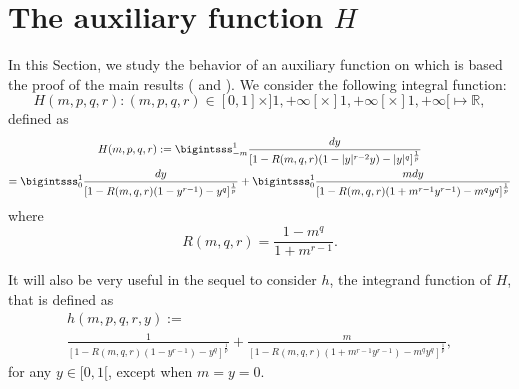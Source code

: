 \documentclass{amsart}
\theoremstyle{definition}
\theoremstyle{remark}
\newcommand{\R}{\mathbb{R}}
\begin{document}
\section{The auxiliary function $H$}
\label{sec_H}
In this Section, we study the behavior of an auxiliary function on which is based the proof of the main results ( and ). We consider the following integral function:
\[ H(m,p,q,r):(m,p,q,r)\in[0,1]\times]1,+\infty[\times]1,+\infty[\times]1,+\infty[\mapsto\R,\]
defined as 
\begin{multline}
\label{Hdef}
H(m,p,q,r):= \bigintsss_{-m}^1\frac{dy}{ [1- R(m,q,r)(1- |y|^{r-2}y) - |y|^q]^\frac1p}\\
=\bigintsss_{0}^1  \frac{dy}{ [1-R(m,q,r)(1-y^{r-1}) - y^q]^\frac1p}  +\bigintsss_{0}^1\frac{mdy}{ [1-R(m,q,r)(1+m^{r-1} y^{r-1}) -m^q y^q]^\frac1p}
\end{multline}
where 
\begin{equation}\label{Rdef}
R(m,q,r)=\frac{1-m^q}{1+m^{r-1}}.
\end{equation}

It will also be very useful in the sequel to consider $h$, the integrand function of $H$, that is defined as
\begin{multline*}
h(m,p,q,r,y):=\\ \frac{1}{ [1-R(m,q,r)(1-y^{r-1}) - y^q ]^\frac 1 p}
+\frac{m}{ [1-R(m,q,r)(1+ m^{r-1}y^{r-1})- m^qy^q ]^\frac 1p},
\end{multline*}
for any $y\in[0,1[$, except when $m=y=0$.
\end{document}
